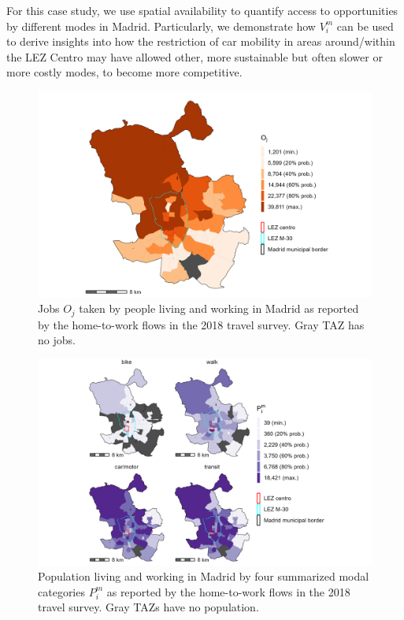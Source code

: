 \documentclass[10pt,letterpaper]{article}
\begin{document}
For this case study, we use spatial availability to quantify access to
opportunities by different modes in Madrid. Particularly, we demonstrate
how \(V_i^m\) can be used to derive insights into how the restriction of
car mobility in areas around/within the LEZ Centro may have allowed
other, more sustainable but often slower or more costly modes, to become
more competitive.

\begin{figure}

{\centering \includegraphics[width=1\linewidth]{images/i_jobs_zn208_plot} 

}

\caption{\label{fig:Fig2} Jobs $O_j$ taken by people living and working in Madrid as reported by the home-to-work flows in the 2018 travel survey. Gray TAZ has no jobs.}\label{fig:jobs-plot}
\end{figure}

\begin{figure}

{\centering \includegraphics[width=1\linewidth]{images/im_populations_zn208_plot} 

}

\caption{\label{fig:Fig3} Population living and working in Madrid by four summarized modal categories $P^m_i$ as reported by the home-to-work flows in the 2018 travel survey. Gray TAZs have no population.}\label{fig:pop-plot}
\end{figure}
\end{document}
